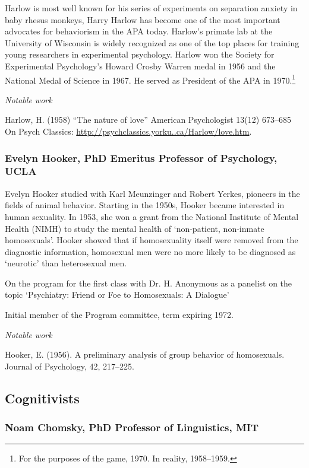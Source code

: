 \begin{refsection}
Harlow is most well known for his series of experiments on separation anxiety in baby rhesus monkeys, Harry Harlow has become one of the most important advocates for behaviorism in the APA today. Harlow's primate lab at the University of Wisconsin is widely recognized as one of the top places for training young researchers in experimental psychology. Harlow won the Society for Experimental Psychology's Howard Crosby Warren medal in 1956 and the National Medal of Science in 1967. He served as President of the APA in 1970.\footnote{For the purposes of the game, 1970. In reality, 1958--1959.} 

\emph{Notable work}

Harlow, H. (1958) “The nature of love” American Psychologist 13(12) 673--685 On Psych Classics: \url{http://psychclassics.yorku..ca/Harlow/love.htm}.

\subsubsection{Evelyn Hooker, PhD Emeritus Professor of Psychology, UCLA}
\label{evelynhookerphdemeritusprofessorofpsychologyucla}

Evelyn Hooker studied with Karl Meunzinger and Robert Yerkes, pioneers in the fields of animal behavior. Starting in the 1950s, Hooker became interested in human sexuality. In 1953, she won a grant from the National Institute of Mental Health (NIMH) to study the mental health of `non-patient, non-inmate homosexuals'. Hooker showed that if homosexuality itself were removed from the diagnostic information, homosexual men were no more likely to be diagnosed as `neurotic' than heterosexual men.

On the program for the first class with Dr. H. Anonymous as a panelist on the topic `Psychiatry: Friend or Foe to Homosexuals: A Dialogue'

Initial member of the Program committee, term expiring 1972.

\emph{Notable work}

Hooker, E. (1956). A preliminary analysis of group behavior of homosexuals. Journal of Psychology, 42, 217--225.

\subsection{Cognitivists}
\label{cognitivists}

\subsubsection{Noam Chomsky, PhD Professor of Linguistics, MIT}
\label{noamchomskyphdprofessoroflinguisticsmit}


\end{refsection}
